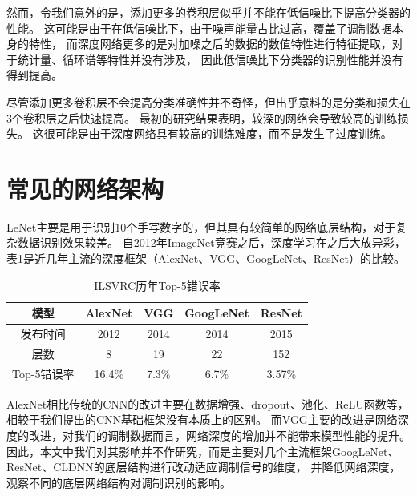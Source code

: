 然而，令我们意外的是，添加更多的卷积层似乎并不能在低信噪比下提高分类器的性能。
这可能是由于在低信噪比下，由于噪声能量占比过高，覆盖了调制数据本身的特性，
而深度网络更多的是对加噪之后的数据的数值特性进行特征提取，对于统计量、循环谱等特性并没有涉及，
因此低信噪比下分类器的识别性能并没有得到提高。\par

尽管添加更多卷积层不会提高分类准确性并不奇怪，但出乎意料的是分类和损失在3个卷积层之后快速提高。
最初的研究结果表明，较深的网络会导致较高的训练损失。
这很可能是由于深度网络具有较高的训练难度，而不是发生了过度训练。\par

\section{常见的网络架构}
LeNet主要是用于识别10个手写数字的，但其具有较简单的网络底层结构，对于复杂数据识别效果较差。
自2012年ImageNet竞赛之后，深度学习在之后大放异彩，表\ref{sec:table_5_1}是近几年主流的深度框架（AlexNet、VGG、GoogLeNet、ResNet）的比较。\par
\begin{table}[H]\label{sec:table_5_1}
	\centering
	\caption{ ILSVRC历年Top-5错误率}
	\begin{tabular}{ccccc}
		\toprule
		模型 & AlexNet & VGG & GoogLeNet & ResNet\\
		\midrule
		发布时间 &	2012 & 2014 & 2014 & 2015\\
		\midrule
		层数 & 8 & 19 & 22 & 152\\
		\midrule
		Top-5错误率 & 16.4\% & 7.3\% & 6.7\% & 3.57\%\\
		\bottomrule 
	\end{tabular}
\end{table}
AlexNet相比传统的CNN的改进主要在数据增强、dropout、池化、ReLU函数等，相较于我们提出的CNN基础框架没有本质上的区别。
而VGG主要的改进是网络深度的改进，对我们的调制数据而言，网络深度的增加并不能带来模型性能的提升。
因此，本文中我们对其影响并不作研究，而是主要对几个主流框架GoogLeNet、ResNet、CLDNN的底层结构进行改动适应调制信号的维度，
并降低网络深度，观察不同的底层网络结构对调制识别的影响。

